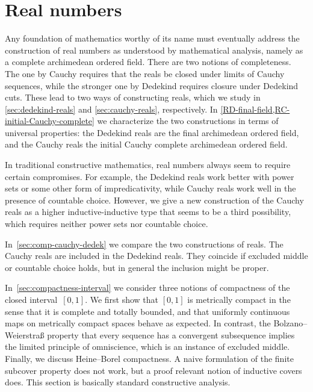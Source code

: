\chapter{Real numbers}
\label{cha:real-numbers}

%
Any foundation of mathematics worthy of its name must eventually address the construction of real numbers as understood by mathematical analysis, namely as a complete archimedean ordered field.
%
There are two notions of completeness. The one by Cauchy requires that the reals be closed under limits of Cauchy sequences, while the stronger one by Dedekind requires closure under Dedekind cuts.
These lead to two ways of constructing reals, which we study in \cref{sec:dedekind-reals} and \cref{sec:cauchy-reals}, respectively. In \cref{RD-final-field,RC-initial-Cauchy-complete} we characterize the two constructions in terms of universal properties: the Dedekind reals are the final archimedean ordered field, and the Cauchy reals the initial Cauchy complete archimedean ordered field.

In traditional constructive mathematics,
%
real numbers always seem to require certain compromises. For example, the Dedekind reals work better with power sets or some other form of impredicativity, while Cauchy reals work well in the presence of countable choice.
%
However, we give a new construction of the Cauchy reals as a higher inductive-inductive type that seems to be a third possibility, which requires neither power sets nor countable choice.

In~\cref{sec:comp-cauchy-dedek} we compare the two constructions of reals. The Cauchy reals are included in the Dedekind reals. They coincide if excluded middle or countable choice holds, but in general the inclusion might be proper.

In~\cref{sec:compactness-interval} we consider three notions of compactness of the closed interval~$[0,1]$. We first show that $[0,1]$ is metrically compact in the sense that it is complete and totally bounded, and that uniformly continuous maps on metrically compact spaces behave as expected. In contrast, the Bolzano--Weierstra\ss{} property that every sequence has a convergent subsequence implies the limited principle of omniscience, which is an instance of excluded middle. Finally, we discuss Heine--Borel compactness. A naive formulation of the finite subcover property does not work, but a proof relevant notion of inductive covers does.
This section is basically standard constructive analysis.

